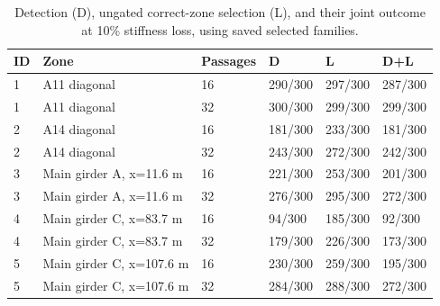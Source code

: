 \begin{table}[htbp]
\centering
\small
\setlength{\tabcolsep}{4pt}
\caption{Detection (D), ungated correct-zone selection (L), and their joint outcome at 10\% stiffness loss, using saved selected families.}
\label{tab:kw51-low-severity-metrics}
\begin{tabular}{@{}llllll@{}}
\toprule
ID & Zone & Passages & D & L & D+L \\
\midrule
1 & A11 diagonal & 16 & 290/300 & 297/300 & 287/300 \\
1 & A11 diagonal & 32 & 300/300 & 299/300 & 299/300 \\
2 & A14 diagonal & 16 & 181/300 & 233/300 & 181/300 \\
2 & A14 diagonal & 32 & 243/300 & 272/300 & 242/300 \\
3 & Main girder A, x=11.6 m & 16 & 221/300 & 253/300 & 201/300 \\
3 & Main girder A, x=11.6 m & 32 & 276/300 & 295/300 & 272/300 \\
4 & Main girder C, x=83.7 m & 16 & 94/300 & 185/300 & 92/300 \\
4 & Main girder C, x=83.7 m & 32 & 179/300 & 226/300 & 173/300 \\
5 & Main girder C, x=107.6 m & 16 & 230/300 & 259/300 & 195/300 \\
5 & Main girder C, x=107.6 m & 32 & 284/300 & 288/300 & 272/300 \\
\bottomrule
\end{tabular}
\end{table}

